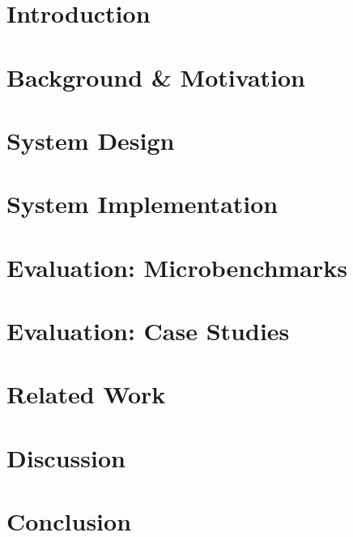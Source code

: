\documentclass[conference]{IEEEtran}
\begin{document}
\begin{abstract}

\end{abstract}

\section{Introduction}
\label{sec:introduction}


\section{Background \& Motivation}
\label{sec:background}


\section{System Design}
\label{sec:design}


\section{System Implementation}
\label{sec:architecture}


\section{Evaluation: Microbenchmarks}
\label{sec:evaluation}


\section{Evaluation: Case Studies}
\label{sec:casestud}


\section{Related Work}
\label{sec:relwork}


\section{Discussion}
\label{sec:discussion}


\section{Conclusion}
\label{sec:conclusion}


\balance


\end{document}

